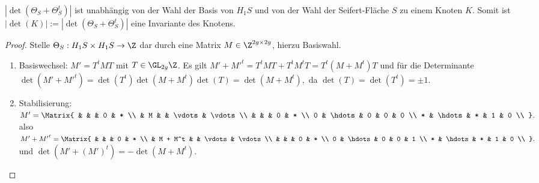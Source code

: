 \begin{prop}
    $|\det(\Theta_S + \Theta_S^t)|$ ist unabhängig von der Wahl der Basis von $H_1 S$ und von der Wahl der Seifert-Fläche $S$ zu einem Knoten $K$.
    Somit ist $|\det(K)| := |\det(\Theta_S + \Theta_S^t)|$ eine Invariante des Knotens.
    \begin{proof}
        Stelle $\Theta_S: H_1 S \times H_1 S \to \Z$ dar durch eine Matrix $M \in \Z^{2g \times 2g}$, hierzu Basiswahl.
        \begin{enumerate}[1)]
            \item
                Basiswechsel: $M' = T^t M T$ mit $T \in \GL_{2g} \Z$.
                Es gilt
                \begin{math}
                    M' + {M'}^t
                    = T^t M T + T^t M^t T
                    = T^t (M + M^t) T
                \end{math}
                und für die Determinante
                \begin{math}
                    \det(M' + {M'}^t)
                    = \det(T^t) \det(M + M^t) \det(T)
                    = \det(M + M^t),
                \end{math}
                da $\det(T) = \det(T^t) = \pm 1$.
            \item
                Stabilisierung:
                \begin{math}
                    M' =
                    \Matrix{
                        &  &  &  0 & * \\
                        & M & & \vdots & \vdots \\
                        & & & 0 & * \\
                        0 & \hdots & 0 & 0 & 0 \\
                        * & \hdots & * & 1 & 0 \\
                    }.
                \end{math}
                also
                \begin{math}
                    M' + {M'}^t =
                    \Matrix{
                        &  &  &  0 & * \\
                        & M + M^t & & \vdots & \vdots \\
                        & & & 0 & * \\
                        0 & \hdots & 0 & 0 & 1 \\
                        * & \hdots & * & 1 & 0 \\
                    }.
                \end{math}
                und $\det(M' + (M')^t) = - \det(M + M^t)$.


\end{enumerate}
\end{proof}
\end{prop}
